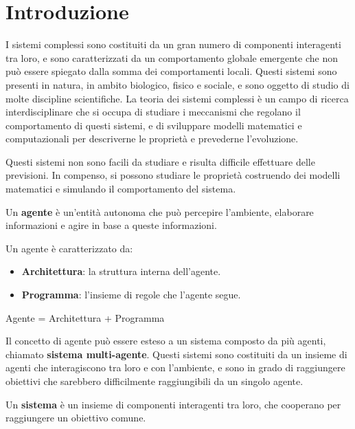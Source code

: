 \chapter{Introduzione}
I sistemi complessi sono costituiti da un gran numero di componenti interagenti 
tra loro, e sono caratterizzati da un comportamento globale emergente che non 
può essere spiegato dalla somma dei comportamenti locali. Questi sistemi sono 
presenti in natura, in ambito biologico, fisico e sociale, e sono oggetto di 
studio di molte discipline scientifiche. La teoria dei sistemi complessi è un 
campo di ricerca interdisciplinare che si occupa di studiare i meccanismi che 
regolano il comportamento di questi sistemi, e di sviluppare modelli matematici e 
computazionali per descriverne le proprietà e prevederne l'evoluzione.

Questi sistemi non sono facili da studiare e risulta difficile effettuare delle
previsioni. In compenso, si possono studiare le proprietà costruendo dei modelli
matematici e simulando il comportamento del sistema. 

\begin{definizione}
    Un \textbf{agente} è un'entità autonoma che può percepire l'ambiente,
    elaborare informazioni e agire in base a queste informazioni.

    Un agente è caratterizzato da:
    \begin{itemize}
        \item \textbf{Architettura}: la struttura interna dell'agente.
        \item \textbf{Programma}: l'insieme di regole che l'agente segue.
    \end{itemize}
    \begin{center}
        Agente = Architettura + Programma
    \end{center}
\end{definizione}

Il concetto di agente può essere esteso a un sistema composto da più agenti,
chiamato \textbf{sistema multi-agente}. Questi sistemi sono costituiti da un
insieme di agenti che interagiscono tra loro e con l'ambiente, e sono in grado
di raggiungere obiettivi che sarebbero difficilmente raggiungibili da un singolo
agente.
\begin{definizione}
    Un \textbf{sistema} è un insieme di componenti interagenti tra loro, che
    cooperano per raggiungere un obiettivo comune.
\end{definizione}